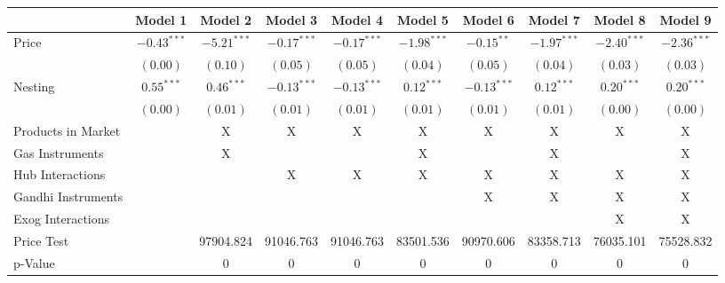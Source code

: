 
\begin{tabular}{l c c c c c c c c c}
\toprule
 & Model 1 & Model 2 & Model 3 & Model 4 & Model 5 & Model 6 & Model 7 & Model 8 & Model 9 \\
\midrule
Price                       & $-0.43^{***}$ & $-5.21^{***}$ & $-0.17^{***}$ & $-0.17^{***}$ & $-1.98^{***}$ & $-0.15^{**}$  & $-1.97^{***}$ & $-2.40^{***}$ & $-2.36^{***}$ \\
                            & $(0.00)$      & $(0.10)$      & $(0.05)$      & $(0.05)$      & $(0.04)$      & $(0.05)$      & $(0.04)$      & $(0.03)$      & $(0.03)$      \\
Nesting                     & $0.55^{***}$  & $0.46^{***}$  & $-0.13^{***}$ & $-0.13^{***}$ & $0.12^{***}$  & $-0.13^{***}$ & $0.12^{***}$  & $0.20^{***}$  & $0.20^{***}$  \\
                            & $(0.00)$      & $(0.01)$      & $(0.01)$      & $(0.01)$      & $(0.01)$      & $(0.01)$      & $(0.01)$      & $(0.00)$      & $(0.00)$      \\
\midrule
Products in Market          &               & X             & X             & X             & X             & X             & X             & X             & X             \\
Gas Instruments             &               & X             &               &               & X             &               & X             &               & X             \\
Hub Interactions            &               &               & X             & X             & X             & X             & X             & X             & X             \\
Gandhi Instruments          &               &               &               &               &               & X             & X             & X             & X             \\
Exog Interactions           &               &               &               &               &               &               &               & X             & X             \\
Price Test                  &               & 97904.824     & 91046.763     & 91046.763     & 83501.536     & 90970.606     & 83358.713     & 76035.101     & 75528.832     \\
p-Value                     &               & 0             & 0             & 0             & 0             & 0             & 0             & 0             & 0             \\

\end{tabular}
